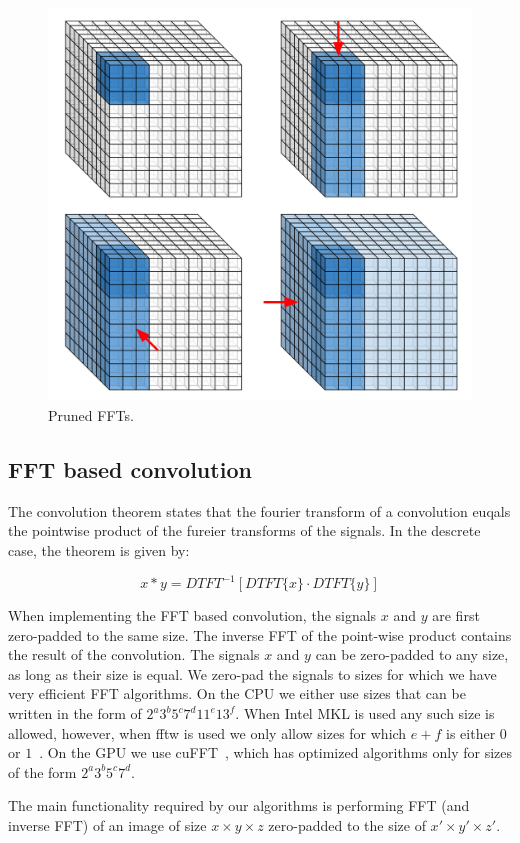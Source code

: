 \documentclass[conference]{IEEEtran}
\begin{document}
\begin{figure}
  \begin{center}
  \includegraphics[width=0.65\columnwidth]{fig/pruned_ffts.pdf}
  \end{center}
  \caption{Pruned FFTs.}
  \label{fig:pruned_ffts}
\end{figure}

\subsection{FFT based convolution}

The convolution theorem states that the fourier transform of a
convolution euqals the pointwise product of the fureier transforms of
the signals.  In the descrete case, the theorem is given by:

$$x \ast y = DTFT^{-1}[DTFT\{x\} \cdot DTFT\{y\}]$$

When implementing the FFT based convolution, the signals $x$ and $y$
are first zero-padded to the same size.  The inverse FFT of the
point-wise product contains the result of the convolution.  The
signals $x$ and $y$ can be zero-padded to any size, as long as their
size is equal.  We zero-pad the signals to sizes for which we have
very efficient FFT algorithms.  On the CPU we either use sizes that
can be written in the form of $2^a3^b5^c7^d11^e13^f$.  When Intel MKL
is used any such size is allowed, however, when fftw is used we only
allow sizes for which $e+f$ is either $0$ or
$1$~\cite{frigo1999fftw,frigo1998fftw}.  On the GPU we use
cuFFT~\cite{nvidia2010cufft}, which has optimized algorithms only for
sizes of the form $2^a3^b5^c7^d$.

The main functionality required by our algorithms is performing FFT
(and inverse FFT) of an image of size $x \times y \times z$
zero-padded to the size of $x' \times y' \times z'$.
\end{document}
